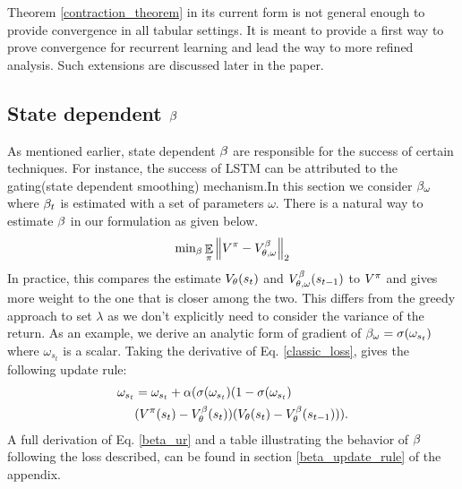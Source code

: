 Theorem \ref{contraction_theorem} in its current form is not general enough to provide convergence in all tabular settings. It is meant to provide a first way to prove convergence for recurrent learning and lead the way to more refined analysis. Such extensions are discussed later in the paper.







\subsection{State dependent $\beta$}
As mentioned earlier, state dependent $\beta$ are responsible for the success of certain techniques. For instance, the success of LSTM \cite{hochreiter1997long} can be attributed to the gating(state dependent smoothing) mechanism.In this section we consider $\beta_{\omega}$ where $\beta_t$ is estimated with a set of parameters $\omega$. There is a natural way to estimate $\beta$ in our formulation as given below.
\begin{equation}
    \text{min}_{\beta} \mathop{\mathbb{E}}_{\pi}\left\lVert V^{\pi}-V^{\beta}_{\theta,\omega}\right\rVert_{2}\label{classic_loss}
\end{equation}
In practice, this compares the estimate $V_{\theta}(s_t)$ and $V^{\beta}_{\theta,\omega}(s_{t-1})$ to $V^{\pi}$ and gives more weight to the one that is closer among the two. This differs from the greedy approach\cite{white2016greedy} to set $\lambda$ as we don't explicitly need to consider the variance of the return.
As an example, we derive an analytic form of gradient of $\beta_{\omega} = \sigma(\omega_{s_t})$ where $\omega_{s_t}$ is a scalar. Taking the derivative of Eq. \ref{classic_loss}, gives the following update rule:
\begin{equation}
\begin{split}
    \omega_{s_t} &= \omega_{s_t} + \alpha ( \sigma (\omega_{s_t})(1 -  \sigma(\omega_{s_t}) \\
    &(V^{\pi}(s_t) -V^{\beta}_{\theta}(s_t) )(V_{\theta}(s_t) - V^{\beta}_{\theta}(s_{t-1}))).  \label{beta_ur}
\end{split}
\end{equation}
A full derivation of Eq. \ref{beta_ur} and a table illustrating the behavior of $\beta$ following the loss described, can be found in section \ref{beta_update_rule} of the appendix.

